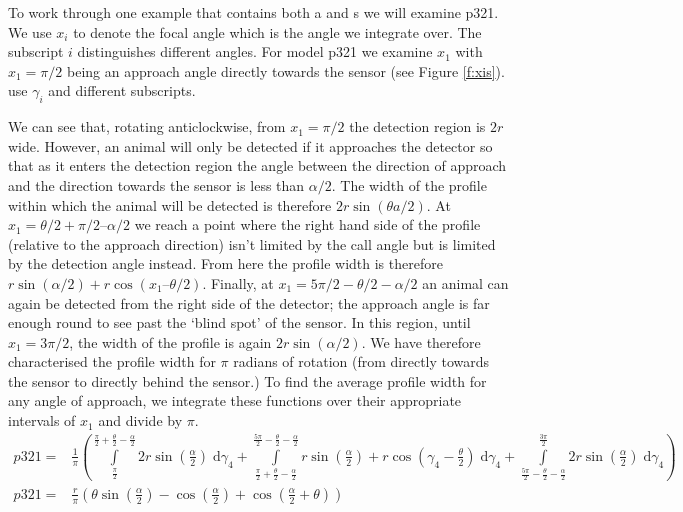 \documentclass[a4paper,10pt,reqno,oneside]{amsart}
\begin{document}
To work through one example that contains both a and s we will examine p321. We use $x_i$ to denote the focal angle which is the angle we integrate over. The subscript $i$ distinguishes different angles. For model p321 we examine $x_1$ with  $x_1 = \pi/2$ being an approach angle directly towards the sensor (see Figure \ref{f:xis}). \cite{rowcliffe2008estimating} use $\gamma_i$ and different subscripts.

We can see that, rotating anticlockwise, from $x_1  = \pi/2$ the detection region is $2r$ wide. However, an animal will only be detected if it approaches the detector so that as it enters the detection region the angle between the direction of approach and the direction towards the sensor is less than $\alpha/2$. The width of the profile within which the animal will be detected is therefore $2r\sin(θa/2)$. At $x_1  = \theta/2 + \pi/2 – \alpha/2$ we reach a point where the right hand side of the profile (relative to the approach direction) isn't limited by the call angle but is limited by the detection angle instead. From here the profile width is therefore $r\sin( \alpha/2) + r\cos( x_1  – \theta/2)$. Finally, at $x_1  = 5\pi/2 - \theta/2  - \alpha/2$ an animal can again be detected from the right side of the detector; the approach angle is far enough round to see past the `blind spot' of the sensor. In this region, until $x_1  = 3\pi/2$, the width of the profile is again $2r\sin( \alpha/2)$. We have therefore characterised the profile width for $\pi$ radians of rotation (from directly towards the sensor to directly behind the sensor.) To find the average profile width for any angle of approach, we integrate these functions over their appropriate intervals of $x_1 $ and divide by $\pi$.
\begin{align}
    p321 =&\frac{1}{\pi} \left(\int\limits_{\frac{\pi}{2}}^{\frac{\pi}{2} + \frac{\theta}{2} - \frac{\alpha}{2}}2 r \sin{\left (\frac{\alpha}{2} \right )}\;\mathrm{d}\gamma_{4}+\int\limits_{\frac{\pi}{2} + \frac{\theta}{2} - \frac{\alpha}{2}}^{\frac{5 \pi}{2} - \frac{\theta}{2} - \frac{\alpha}{2}}r \sin{\left (\frac{\alpha}{2} \right )} + r \cos{\left (\gamma_{4} - \frac{\theta}{2} \right )}\;\mathrm{d}\gamma_{4}+\int\limits_{\frac{5 \pi}{2} - \frac{\theta}{2} - \frac{\alpha}{2}}^{\frac{3 \pi}{2}}2 r \sin{\left (\frac{\alpha}{2} \right )}\;\mathrm{d}\gamma_{4}\right)\\
    p321 =& \frac{r}{\pi} \left(\theta \sin{\left (\frac{\alpha}{2} \right )} - \cos{\left (\frac{\alpha}{2} \right )} + \cos{\left (\frac{\alpha}{2} + \theta \right )}\right)
\end{align}
\end{document}
